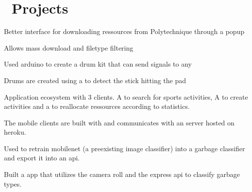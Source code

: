 \section{\faFlask \ Projects}
\begin{tightemize}
\item Better interface for downloading ressources from  Polytechnique through a  popup
\item Allows mass download and filetype filtering
\end{tightemize}

\sectionsep

\begin{tightemize}
\item Used arduino to create a drum kit that can send  signals to any 
\item Drums are created using a  to detect the stick hitting the pad 
\end{tightemize}

\sectionsep

\begin{tightemize}
\item Application ecosystem with 3 clients. A  to search for sports activities, A  to create activities and a  to reallocate ressources according to statistics.
\item The mobile clients are built with  and communicates with an  server hosted on heroku.
\end{tightemize}

\sectionsep

\begin{tightemize}
\item Used  to retrain mobilenet (a preexisting image classifier) into a garbage classifier and export it into an  api.
\item Built a  app that utilizes the camera roll and the express api to classify garbage types.
\end{tightemize}


